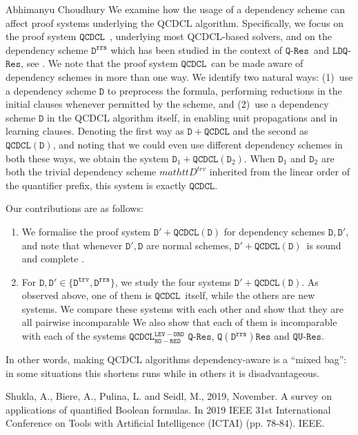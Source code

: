 \documentclass[report]{owrart}
\newcommand{\Res}{\mbox{$\mathtt{Res}$}}
\newcommand{\QCDCL}{\mbox{$\mathtt{QCDCL}$}}
\newcommand{\QRes}{\mbox{$\mathtt{Q}$-$\Res$}} %
\newcommand{\QURes}{\mbox{$\mathtt{QU}$-$\Res$}} %
\newcommand{\LDQRes}{\mbox{$\mathtt{LDQ}$-$\Res$}} %
\newcommand{\DQCDCLDp}[2]{\mbox{${#1}+\QCDCL(#2)$}}
\begin{document}
\begin{report}
\begin{talk}{Abhimanyu Choudhury}
  We examine how the usage of a dependency scheme can affect proof systems underlying the QCDCL algorithm. 
  Specifically, we focus on the proof system \QCDCL\ , underlying most QCDCL-based solvers, and on the dependency scheme $\mathtt{D^{rrs}}$ which has been studied in the
  context of \QRes\ and \LDQRes, see \cite{SS-TCS16,BB-SAT17,PSS-JAR19}.
  We note that the proof system \QCDCL\ can be made aware of dependency schemes in more than one way. We identify two natural ways: (1)~use a dependency scheme $\mathtt{D}$ to preprocess the formula, performing reductions in the initial clauses whenever permitted by the scheme, and (2)~use a dependency scheme $\mathtt{D}$ in the QCDCL algorithm itself, in enabling unit propagations and in learning clauses.  Denoting the first way as $\mathtt{D} + \QCDCL$ and the second as $\QCDCL(\mathtt{D})$, and noting that we could even use different dependency schemes in both these ways, we obtain the system $\DQCDCLDp{\mathtt{D}_1}{\mathtt{D}_2}$. When $\mathtt{D}_1$ and $\mathtt{D}_2$ are both the trivial dependency scheme $mathtt{D^{trv}}$ inherited from the linear order of the quantifier prefix, this system is exactly \QCDCL.
  
  Our contributions are as follows:
  \begin{enumerate}
    \item 
    We formalise the proof system \DQCDCLDp{\mathtt{D}'}{\mathtt{D}} for dependency schemes $\mathtt{D}, \mathtt{D}'$,
      and note that whenever $\mathtt{D}',\mathtt{D}$ are  normal schemes, \DQCDCLDp{\mathtt{D}'}{\mathtt{D}}\ is sound
    and complete .
    \item  For $\mathtt{D},\mathtt{D}'\in\{\mathtt{D^{trv}},\mathtt{D^{rrs}}\}$, we study the four systems
    \DQCDCLDp{\mathtt{D}'}{\mathtt{D}}. As observed above, one of them is \QCDCL\ itself, while the others are new systems.
    We compare these systems with each other and show that they are all pairwise incomparable We also show that each of them is incomparable with each of the systems $\QCDCL^{\mathtt{LEV-ORD}}_{\mathtt{NO-RED}}$ \QRes,  $\mathtt{Q(D^{rrs})Res}$ and \QURes.
    
  \end{enumerate}
  In other words, making QCDCL algorithms dependency-aware is a
  ``mixed bag'': in some situations this shortens runs while in others
  it is disadvantageous.  
  
  
  \begin{thebibliography}{99}
  
  Shukla, A., Biere, A., Pulina, L. and Seidl, M., 2019, November. A survey on applications of quantified Boolean formulas. In 2019 IEEE 31st International Conference on Tools with Artificial Intelligence (ICTAI) (pp. 78-84). IEEE.
  

\end{thebibliography}
\end{talk}
\end{report}
\end{document}
